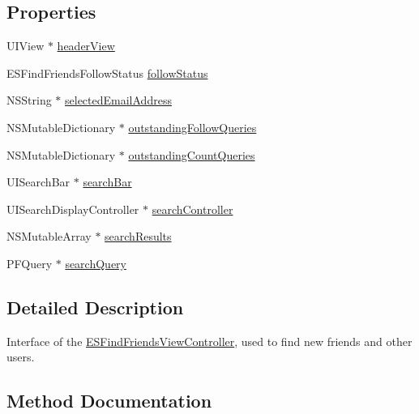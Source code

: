 \subsection*{Properties}
\begin{DoxyCompactItemize}
\item 
U\+I\+View $\ast$ \hyperlink{interface_e_s_find_friends_view_controller_a910d44183e8342030fc6253585a67f7f}{header\+View}
\item 
E\+S\+Find\+Friends\+Follow\+Status \hyperlink{interface_e_s_find_friends_view_controller_a700c7e9689b1905405a2f5ed2fd057a3}{follow\+Status}
\item 
N\+S\+String $\ast$ \hyperlink{interface_e_s_find_friends_view_controller_a3796dce47eea3df52570486f147ed4c1}{selected\+Email\+Address}
\item 
N\+S\+Mutable\+Dictionary $\ast$ \hyperlink{interface_e_s_find_friends_view_controller_ac6a9840d8336accbe6aed4f6c7390a45}{outstanding\+Follow\+Queries}
\item 
N\+S\+Mutable\+Dictionary $\ast$ \hyperlink{interface_e_s_find_friends_view_controller_aa59461977ffd677683d737587e035382}{outstanding\+Count\+Queries}
\item 
U\+I\+Search\+Bar $\ast$ \hyperlink{interface_e_s_find_friends_view_controller_ac0da7a98d3c42f522f0a07a427b809b2}{search\+Bar}
\item 
U\+I\+Search\+Display\+Controller $\ast$ \hyperlink{interface_e_s_find_friends_view_controller_afec3de77bea307e1ed8552c89b93c9ae}{search\+Controller}
\item 
N\+S\+Mutable\+Array $\ast$ \hyperlink{interface_e_s_find_friends_view_controller_aba3bb2973883c6a6b78e8bdcfb1f7ed7}{search\+Results}
\item 
P\+F\+Query $\ast$ \hyperlink{interface_e_s_find_friends_view_controller_afe05f16e5341cefd3ccc7af7589e25c4}{search\+Query}
\end{DoxyCompactItemize}


\subsection{Detailed Description}
Interface of the \hyperlink{interface_e_s_find_friends_view_controller}{E\+S\+Find\+Friends\+View\+Controller}, used to find new friends and other users. 

\subsection{Method Documentation}
\hypertarget{interface_e_s_find_friends_view_controller_afc745b7afff5719eeb03ea1d04bab005}{}
